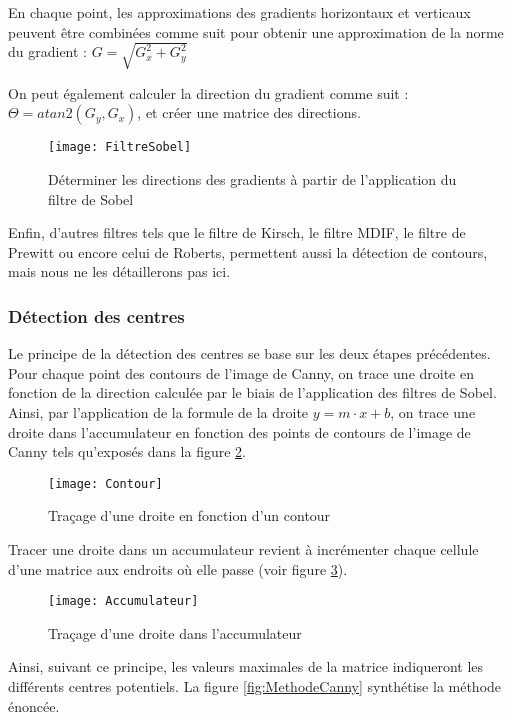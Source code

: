 En chaque point, les approximations des gradients horizontaux et verticaux peuvent être combinées comme suit pour obtenir une approximation de la norme du gradient : $G = \sqrt{G_x^2 + G_y^2}$

On peut également calculer la direction du gradient comme suit : $\Theta = atan2(G_y, G_x)$, et créer une matrice des directions.

\begin{figure}[h]
  \centering
  \texttt{[image: FiltreSobel]}
  \caption{Déterminer les directions des gradients à partir de l’application du filtre de Sobel}
  \label{fig:FiltreSobel}
\end{figure}

Enfin, d’autres filtres tels que le filtre de Kirsch, le filtre MDIF, le filtre de Prewitt ou encore celui de Roberts, permettent aussi la détection de contours, mais nous ne les détaillerons pas ici.

\subsubsection{Détection des centres}

Le principe de la détection des centres se base sur les deux étapes précédentes. Pour chaque point des contours de l’image de Canny, on trace une droite en fonction de la direction calculée par le biais de l’application des filtres de Sobel. Ainsi, par l’application de la formule de la droite $y = m \cdot x + b$, on trace une droite dans l’accumulateur en fonction des points de contours de l’image de Canny tels qu’exposés dans la figure \ref{fig:Contour}.

\begin{figure}[h]
  \centering
  \texttt{[image: Contour]}
  \caption{Traçage d’une droite en fonction d’un contour}
  \label{fig:Contour}
\end{figure}

Tracer une droite dans un accumulateur revient à incrémenter chaque cellule d’une matrice aux endroits où elle passe (voir figure \ref{fig:Accumulateur}).

\begin{figure}[h]
  \centering
  \texttt{[image: Accumulateur]}
  \caption{Traçage d’une droite dans l’accumulateur}
  \label{fig:Accumulateur}
\end{figure}

Ainsi, suivant ce principe, les valeurs maximales de la matrice indiqueront les différents centres potentiels. La figure \ref{fig:MethodeCanny} synthétise la méthode énoncée. 

